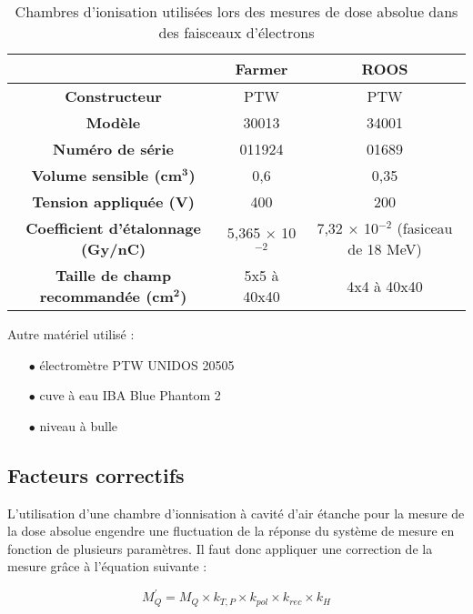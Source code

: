 \documentclass{article}
\begin{document}
\begin{table}[h]
  \centering
  \begin{tabular}{c|c|c|}
  \cline{2-3}
  \textbf{} & \textbf{Farmer} & \textbf{ROOS} \\ \hline
  \multicolumn{1}{|c|}{\textbf{Constructeur}} & PTW & PTW \\
  \multicolumn{1}{|c|}{\textbf{Modèle}} & 30013 & 34001 \\
  \multicolumn{1}{|c|}{\textbf{Numéro de série}} & 011924 & 01689 \\
  \multicolumn{1}{|c|}{\textbf{Volume sensible (cm}$\mathbf{^3}$\textbf{)}} & 0,6 & 0,35 \\
  \multicolumn{1}{|c|}{\textbf{Tension appliquée (V)}} & 400 & 200 \\
  \multicolumn{1}{|c|}{\textbf{Coefficient d'étalonnage (Gy/nC)}} & 5,365 $\times$ 10$^{-2}$ & 7,32 $\times$ 10$^{-2}$ (fasiceau de 18 MeV)\\
  \multicolumn{1}{|c|}{\textbf{Taille de champ recommandée (cm}$\mathbf{^2}$\textbf{)}} & 5x5 à 40x40 & 4x4 à 40x40 \\ \hline
  \end{tabular}
  \caption{Chambres d'ionisation utilisées lors des mesures de dose absolue dans des faisceaux d'électrons}
  \label{table_matos_chambres}
\end{table}

Autre matériel utilisé :

\begin{itemize}
  \item[$\bullet$] électromètre PTW UNIDOS 20505
  \item[$\bullet$] cuve à eau IBA Blue Phantom 2
  \item[$\bullet$] niveau à bulle
\end{itemize}

\subsection{Facteurs correctifs}

L'utilisation d'une chambre d'ionnisation à cavité d'air étanche pour la mesure de la dose absolue engendre une fluctuation de la réponse du système de mesure en fonction de plusieurs paramètres. Il faut donc appliquer une correction de la mesure grâce à l'équation suivante :

\begin{equation}
  M_{Q}^{'} = M_Q \times k_{T,P} \times k_{pol} \times k_{rec} \times k_H
  \label{eq_corr_charge}
\end{equation}
\end{document}

